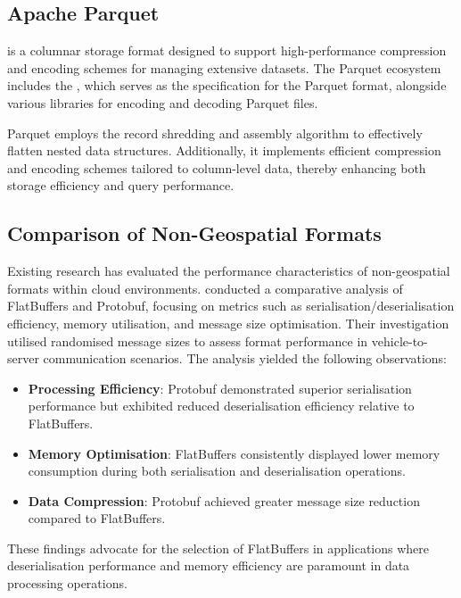 \subsection{Apache Parquet}
\label{rw:non_geospatial_formats:parquet}
\citet{parquet} is a columnar storage format designed to support high-performance compression and encoding schemes for managing extensive datasets. The Parquet ecosystem includes the \citet{parquet-format}, which serves as the specification for the Parquet format, alongside various libraries for encoding and decoding Parquet files.

Parquet employs the record shredding and assembly algorithm \citep{dremel_2010} to effectively flatten nested data structures. Additionally, it implements efficient compression and encoding schemes tailored to column-level data, thereby enhancing both storage efficiency and query performance.

\subsection{Comparison of Non-Geospatial Formats}
\label{rw:non_geospatial_formats:comparison}
Existing research has evaluated the performance characteristics of non-geospatial formats within cloud environments. \citet{daniel_persson_2020} conducted a comparative analysis of FlatBuffers and Protobuf, focusing on metrics such as serialisation/deserialisation efficiency, memory utilisation, and message size optimisation. Their investigation utilised randomised message sizes to assess format performance in vehicle-to-server communication scenarios. The analysis yielded the following observations:

\begin{itemize}
  \item \textbf{Processing Efficiency}: Protobuf demonstrated superior serialisation performance but exhibited reduced deserialisation efficiency relative to FlatBuffers.
  \item \textbf{Memory Optimisation}: FlatBuffers consistently displayed lower memory consumption during both serialisation and deserialisation operations.
  \item \textbf{Data Compression}: Protobuf achieved greater message size reduction compared to FlatBuffers.
\end{itemize}

These findings advocate for the selection of FlatBuffers in applications where deserialisation performance and memory efficiency are paramount in data processing operations.

